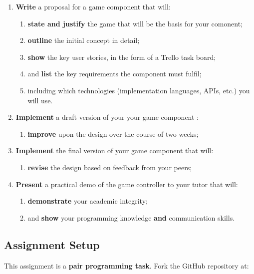 \documentclass{../fal_assignment}
\begin{document}
\begin{enumerate}[label=(\Alph*)]
    \item \textbf{Write} a proposal for a game component that will:
        	\begin{enumerate}[label=\roman*.]
    		\item \textbf{state and justify} the game that will be the basis for your comonent;
    		\item \textbf{outline} the initial concept in detail;
		\item \textbf{show} the key user stories, in the form of a Trello task board;
		\item and \textbf{list} the key requirements the component must fulfil;
		\item including which technologies (implementation languages, APIs, etc.) you will use.  
	\end{enumerate}
    \item \textbf{Implement} a draft version of your your game component :
    	\begin{enumerate}[label=\roman*.]
		\item \textbf{improve} upon the design over the course of two weeks;
	\end{enumerate}
    \item \textbf{Implement} the final version of your game component that will:
    	\begin{enumerate}[label=\roman*.]
    		\item \textbf{revise} the design based on feedback from your peers;
	\end{enumerate}
     \item \textbf{Present} a practical demo of the game controller to your tutor that will:
    	\begin{enumerate}[label=\roman*.]
    		\item \textbf{demonstrate} your academic integrity;
    		\item and \textbf{show} your programming knowledge \textbf{and} communication skills.
	\end{enumerate}
\end{enumerate}    

\subsection*{Assignment Setup}

This assignment is a \textbf{pair programming task}. Fork the GitHub repository at:
\end{document}
